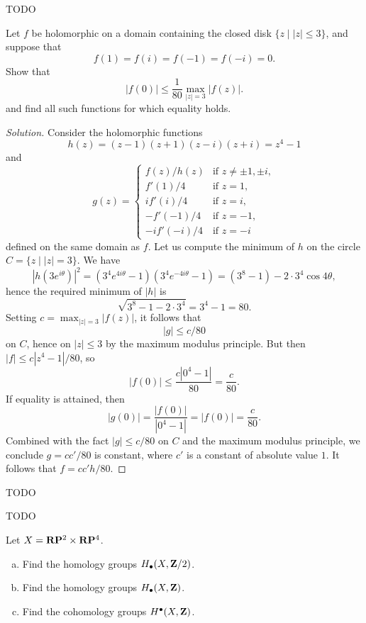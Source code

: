 
TODO


Let $f$ be holomorphic on a domain containing the closed disk $\{ z \;|\; |z| \leq 3 \}$, and suppose that
\[
f(1) = f(i) = f(-1) = f(-i) = 0.
\]
Show that
\[
|f(0)| \leq \frac{1}{80} \max_{|z|=3}|f(z)|.
\]
and find all such functions for which equality holds.

\begin{proof}[Solution]
  Consider the holomorphic functions
  \[
  h(z) = (z-1)(z+1)(z-i)(z+i) = z^4-1
  \]
  and
  \[
  g(z) =
  \begin{cases}
    f(z)/h(z) & \textrm{if } z \neq \pm 1, \pm i, \\
    f'(1)/4 & \textrm{if } z = 1, \\
    i f'(i)/4 & \textrm{if } z = i, \\
    -f'(-1)/4 & \textrm{if } z = -1, \\
    -i f'(-i)/4 & \textrm{if } z = -i
  \end{cases}
  \]
  defined on the same domain as $f$. Let us compute the minimum of $h$ on the circle $C = \{ z \;|\; |z| = 3 \}$. We have
  \[
  |h(3 e^{i\theta})|^2 =
  \left(3^4 e^{4 i \theta} - 1\right)\left(3^4 e^{-4 i \theta} - 1\right) =
  (3^8-1) - 2 \cdot 3^4 \cos 4\theta,
  \]
  hence the required minimum of $|h|$ is
  \[
  \sqrt{3^8 - 1 - 2 \cdot 3^4} = 3^4 - 1 = 80.
  \]
  Setting $c = \max_{|z|=3}|f(z)|$, it follows that
  \[
  |g| \leq c/80
  \]
  on $C$, hence on $|z| \leq 3$ by the maximum modulus principle. But then $|f| \leq c|z^4-1|/80$, so
  \[
  |f(0)| \leq \frac{c |0^4 - 1|}{80} = \frac{c}{80}.
  \]
  If equality is attained, then
  \[
  |g(0)| = \frac{|f(0)|}{|0^4-1|} = |f(0)| = \frac{c}{80}.
  \]
  Combined with the fact $|g| \leq c/80$ on $C$ and the maximum modulus principle, we conclude $g = c c'/80$ is constant, where $c'$ is a constant of absolute value $1$. It follows that $f = c c' h/80$.
\end{proof}


TODO


TODO


Let $X = \mathbf{R}\mathbf{P}^2 \times \mathbf{R}\mathbf{P}^4$.
\begin{enumerate}[(a)]
\item Find the homology groups $H_\bullet(X, \mathbf{Z}/2)$.
\item Find the homology groups $H_\bullet(X, \mathbf{Z})$.
\item Find the cohomology groups $H^\bullet(X,\mathbf{Z})$.
\end{enumerate}

